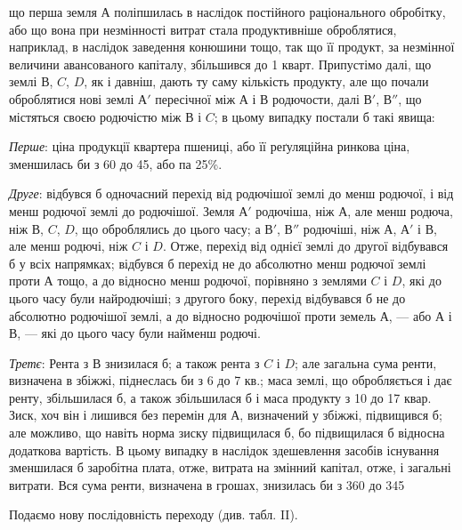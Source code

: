 \parcont{}  %
що перша земля $А$ поліпшилась в наслідок постійного раціонального обробітку,
або що вона при незмінності витрат стала продуктивніше оброблятися,
наприклад, в наслідок заведення конюшини тощо, так що її продукт, за незмінної
величини авансованого капіталу, збільшився до 1 кварт. Припустімо
далі, що землі $В$, $C$, $D$, як і давніш, дають ту саму кількість продукту, але що
почали оброблятися нові землі $А'$ пересічної між $А$ і $В$ родючости, далі $В'$, $В''$, що
містяться своєю родючістю між $В$ і $C$; в цьому випадку постали б такі явища:

\emph{Перше}: ціна продукції квартера пшениці, або її реґуляційна ринкова
ціна, зменшилась би з 60 до 45, або па 25\%.

\emph{Друге}: відбувся б одночасний перехід від родючішої землі до менш
родючої, і від менш родючої землі до родючішої. Земля $А'$ родючіша, ніж $А$, але
менш родюча, ніж $В$, $C$, $D$, що оброблялись до цього часу; а $В'$, $В''$ родючіші, ніж
$А$, $А'$ і $В$, але менш родючі, ніж $C$ і $D$. Отже, перехід від однієї землі до другої
відбувався б у всіх напрямках; відбувся б перехід не до абсолютно
менш родючої землі проти $А$ тощо, а до відносно менш родючої, порівняно
з землями $C$ і $D$, які до цього часу були найродючіші; з другого боку, перехід
відбувався б не до абсолютно родючішої землі, а до відносно родючішої проти
земель $А$, — або $А$ і $В$, — які до цього часу були найменш родючі.

\emph{Третє}: Рента з $В$ знизилася б; а також рента з $C$ і $D$; але загальна
сума ренти, визначена в збіжжі, піднеслась би з 6 до 7 кв.; маса землі, що
обробляється і дає ренту, збільшилася б, а також збільшилася б і маса продукту
з 10 до 17 квар. Зиск, хоч він і лишився без перемін для $А$, визначений у
збіжжі, підвищився б; але можливо, що навіть норма зиску підвищилася б, бо
підвищилася б відносна додаткова вартість. В цьому випадку в наслідок здешевлення
засобів існування зменшилася б заробітна плата, отже, витрата на змінний капітал,
отже, і загальні витрати. Вся сума ренти, визначена в грошах, знизилась би з 360 до 345

Подаємо нову послідовність переходу
(див. табл. II).


